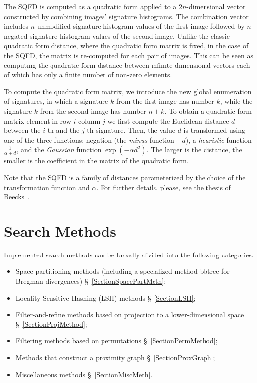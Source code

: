 \documentclass[runningheads,a4paper]{llncs}
\begin{document}
{The SQFD is computed as a quadratic form applied to a $2n$-dimensional vector constructed
by combining images' signature histograms. 
The combination vector includes
$n$ unmodified signature histogram values of the first image 
followed by $n$ negated signature histogram values of the second image. 
Unlike the classic quadratic form distance, where the quadratic form matrix is fixed,
in the case of the SQFD, the matrix is re-computed for each pair of images.
This can be seen as computing the quadratic form distance between infinite-dimensional vectors
each of which has only a finite number of non-zero elements.

To compute the quadratic form matrix, we introduce the new global enumeration of signatures,
in which a signature $k$ from the first image has number $k$, while
the signature $k$ from the second image has number $n+k$.
To obtain a quadratic form matrix element in row $i$ column $j$ 
we first compute the Euclidean distance $d$ between the $i$-th and the $j$-th signature.
Then, the value $d$ is transformed using one of the three functions:
negation (the \emph{minus} function $-d$), a \emph{heuristic} function $\frac{1}{\alpha + d}$,
and the \emph{Gaussian} function $\exp(-\alpha d^2)$.
The larger is the distance, the smaller is the coefficient in the matrix of the quadratic form.

Note that the SQFD is a family of distances parameterized by the choice of the transformation
function and $\alpha$.
For further details, please, see the thesis of Beecks~\cite{Beecks:2013}.






\section{Search Methods}\label{SectionMethods}
Implemented search methods can be broadly divided into the following 
categories:
\begin{itemize}
\item Space partitioning methods (including a specialized method bbtree for Bregman divergences) \S~\ref{SectionSpacePartMeth};
\item Locality Sensitive Hashing (LSH) methods \S~\ref{SectionLSH};
\item Filter-and-refine methods based on projection to a lower-dimensional space \S~\ref{SectionProjMethod};
\item Filtering methods based on permutations \S~\ref{SectionPermMethod};
\item Methods that construct a proximity graph \S~\ref{SectionProxGraph};
\item Miscellaneous methods \S~\ref{SectionMiscMeth}.
\end{itemize}

}
\end{document}
